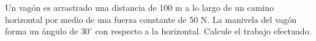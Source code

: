 \item Un vagón es arrastrado una distancia de 100 m a lo largo de un camino horizontal por medio de una fuerza constante de 50 N. La manivela del vagón forma un ángulo de $30^\circ$ con respecto a la horizontal. Calcule el trabajo efectuado.
